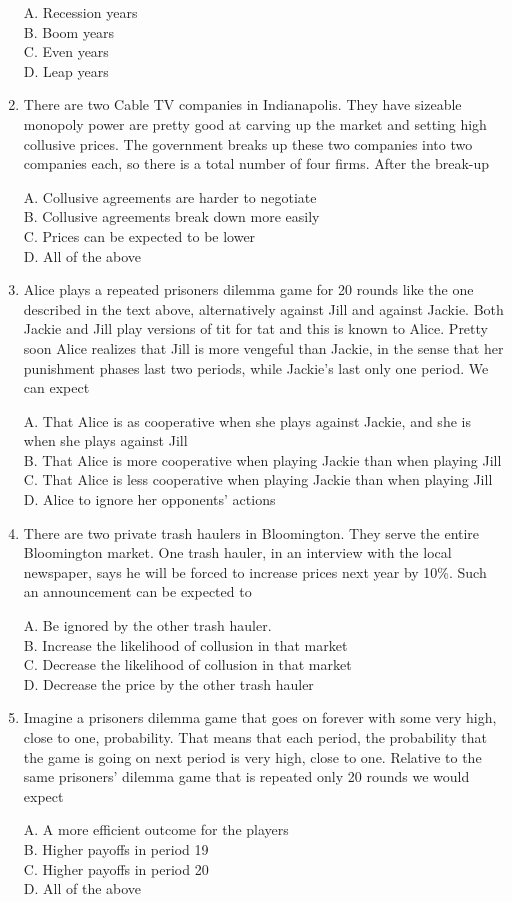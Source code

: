 \documentclass[
]{book}
\begin{document}
\begin{enumerate}
  A. Recession years\\
  B. Boom years\\
  C. Even years\\
  D. Leap years
\item
  There are two Cable TV companies in Indianapolis. They have sizeable monopoly power are pretty good at carving up the market and setting high collusive prices. The government breaks up these two companies into two companies each, so there is a total number of four firms. After the break-up

  A. Collusive agreements are harder to negotiate\\
  B. Collusive agreements break down more easily\\
  C. Prices can be expected to be lower\\
  D. All of the above
\item
  Alice plays a repeated prisoners dilemma game for 20 rounds like the one described in the text above, alternatively against Jill and against Jackie. Both Jackie and Jill play versions of tit for tat and this is known to Alice. Pretty soon Alice realizes that Jill is more vengeful than Jackie, in the sense that her punishment phases last two periods, while Jackie's last only one period. We can expect

  A. That Alice is as cooperative when she plays against Jackie, and she is when she plays against Jill\\
  B. That Alice is more cooperative when playing Jackie than when playing Jill\\
  C. That Alice is less cooperative when playing Jackie than when playing Jill\\
  D. Alice to ignore her opponents' actions
\item
  There are two private trash haulers in Bloomington. They serve the entire Bloomington market. One trash hauler, in an interview with the local newspaper, says he will be forced to increase prices next year by 10\%. Such an announcement can be expected to

  A. Be ignored by the other trash hauler.\\
  B. Increase the likelihood of collusion in that market\\
  C. Decrease the likelihood of collusion in that market\\
  D. Decrease the price by the other trash hauler
\item
  Imagine a prisoners dilemma game that goes on forever with some very high, close to one, probability. That means that each period, the probability that the game is going on next period is very high, close to one. Relative to the same prisoners' dilemma game that is repeated only 20 rounds we would expect

  A. A more efficient outcome for the players\\
  B. Higher payoffs in period 19\\
  C. Higher payoffs in period 20\\
  D. All of the above
\end{enumerate}
\end{document}
